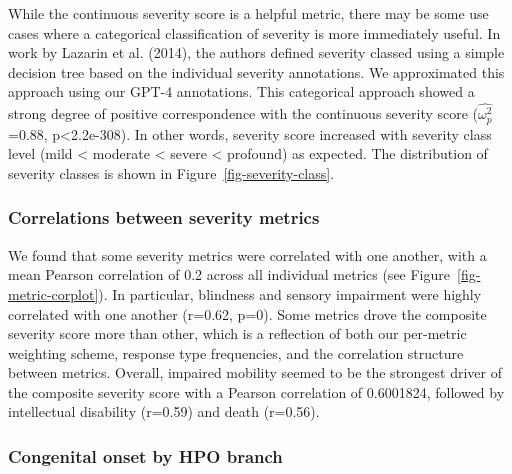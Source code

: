 \documentclass[
]{agujournal2019}
\begin{document}
While the continuous severity score is a helpful metric, there may be
some use cases where a categorical classification of severity is more
immediately useful. In work by Lazarin et al. (2014), the authors
defined severity classed using a simple decision tree based on the
individual severity annotations. We approximated this approach using our
GPT-4 annotations. This categorical approach showed a strong degree of
positive correspondence with the continuous severity score
(\(\hat{\omega_{p}^2}\)=0.88, p\textless2.2e-308). In other words,
severity score increased with severity class level (mild \textless{}
moderate \textless{} severe \textless{} profound) as expected. The
distribution of severity classes is shown in
Figure~\ref{fig-severity-class}.

\subsubsection{Correlations between severity
metrics}\label{correlations-between-severity-metrics}

We found that some severity metrics were correlated with one another,
with a mean Pearson correlation of 0.2 across all individual metrics
(see Figure~\ref{fig-metric-corplot}). In particular, blindness and
sensory impairment were highly correlated with one another (r=0.62,
p=0). Some metrics drove the composite severity score more than other,
which is a reflection of both our per-metric weighting scheme, response
type frequencies, and the correlation structure between metrics.
Overall, impaired mobility seemed to be the strongest driver of the
composite severity score with a Pearson correlation of 0.6001824,
followed by intellectual disability (r=0.59) and death (r=0.56).

\subsubsection{Congenital onset by HPO
branch}\label{congenital-onset-by-hpo-branch}
\end{document}
